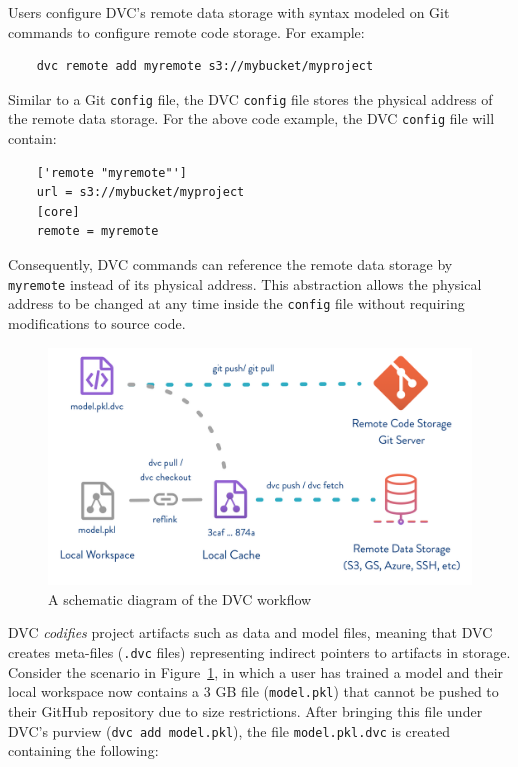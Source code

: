 \documentclass[10pt,sigconf, authordraft]{acmart}
\begin{document}
Users configure DVC's remote data storage with syntax modeled on Git commands to configure remote code storage. For example:

\begin{verbatim}
    dvc remote add myremote s3://mybucket/myproject
\end{verbatim}

Similar to a Git \verb|config| file, the DVC \verb|config| file stores the physical address of the remote data storage. For the above code example, the DVC \verb|config| file will contain:

\begin{verbatim}
    ['remote "myremote"']
    url = s3://mybucket/myproject
    [core]
    remote = myremote
\end{verbatim}

Consequently, DVC commands can reference the remote data storage by \verb|myremote| instead of its physical address. This abstraction allows the physical address to be changed at any time inside the \verb|config| file without requiring modifications to source code.

\begin{figure}[h]
  \centering
  \includegraphics[width=\linewidth]{flow-large.png}
  \caption{A schematic diagram of the DVC workflow}
  \label{fig:fig1}
\end{figure}

DVC \textit{codifies} project artifacts such as data and model files, meaning that DVC creates meta-files (\verb|.dvc| files) representing indirect pointers to artifacts in storage. Consider the scenario in Figure~\ref{fig:fig1}, in which a user has trained a model and their local workspace now contains a 3 GB file (\verb|model.pkl|) that cannot be pushed to their GitHub repository due to size restrictions. After bringing this file under DVC's purview (\verb|dvc add model.pkl|), the file \verb|model.pkl.dvc| is created containing the following:
\end{document}
